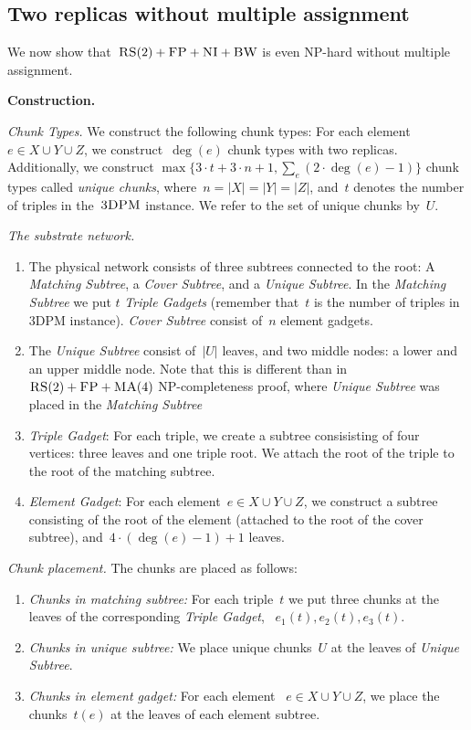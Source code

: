\documentclass[preprint,12pt]{elsarticle}
\newcommand{\CC}{\textsc{NI}}
\newcommand{\FP}{\textsc{FP}}
\newcommand{\RS}{\textsc{RS}}
\newcommand{\BW}{\textsc{BW}}
\newcommand{\MA}{\textsc{MA}}
\newcommand{\TDPM}{\textsc{3DPM}}
\newcommand{\UnqSubtree}{{{\emph{Unique Subtree}}}}
\newcommand{\MatchSubtree}{{\emph{Matching Subtree}}}
\newcommand{\CoverSubtree}{{\emph{Cover Subtree}}}
\newcommand{\TripleGadget}{{\emph{Triple Gadget}}}
\newcommand{\TripleGadgets}{{\emph{Triple Gadgets}}}
\newcommand{\ElGadget}{{\emph{Element Gadget}}}
\begin{document}
\subsection{Two replicas without multiple assignment}

We now show that~$\RS(2)+\FP+\CC+\BW$ is even NP-hard without multiple
assignment.

\noindent \textbf{Construction.}

\emph{Chunk Types.}  We construct the following chunk types: For each
element~$e\in X\cup Y\cup Z$, we construct~$\deg(e)$ chunk types with
two replicas. Additionally, we construct
$\max\{3\cdot t + 3\cdot n + 1, \sum_e(2\cdot \deg(e)-1)\}$
chunk types called \emph{unique chunks}, where~$n = |X| = |Y| = |Z|$,
and~$t$ denotes the number of triples in the~$\TDPM$ instance. We
refer to the set of unique chunks by~$U$.

\emph{The substrate network.}

\begin{enumerate}
  \item The physical network consists of three subtrees connected to
  the root: A {\MatchSubtree}, a {\CoverSubtree}, and a
  {\UnqSubtree}. In the {\MatchSubtree} we put $t$
  {\TripleGadgets} (remember that~$t$ is the number of triples in
  {\TDPM} instance). {\CoverSubtree} consist of~$n$ element gadgets.
  \item The {\UnqSubtree} consist of~$|U|$ leaves, and two middle nodes:
  a lower and an upper middle node. Note that this is different than in $\RS(2)+\FP+\MA(4)$ NP-completeness proof, where {\UnqSubtree} was placed in the {\MatchSubtree}
  \item \TripleGadget: For each triple, we create a subtree
  consisisting of four vertices: three leaves and one triple root.  We
  attach the root of the triple to the root of the matching subtree.
  \item \ElGadget: For each element~$e \in X\cup Y\cup Z$, we
  construct a subtree consisting of the root of the element (attached
  to the root of the cover subtree), and~$4\cdot(\deg(e)-1)+1$ leaves.
\end{enumerate}

\emph{Chunk placement.}
The chunks are placed as follows:
\begin{enumerate}
  \item \emph{Chunks in matching subtree:} For each triple~$t$ we put
  three chunks at the leaves of the corresponding \TripleGadget,
 ~$e_1(t), e_2(t), e_3(t)$.
  \item \emph{Chunks in unique subtree:} We place unique chunks~$U$ at
  the leaves of {\UnqSubtree}.
  \item \emph{Chunks in element gadget:} For each element
 ~$e\in X\cup Y\cup Z$, we place the chunks~$t(e)$ at the leaves of
  each element subtree.
\end{enumerate}
\end{document}
